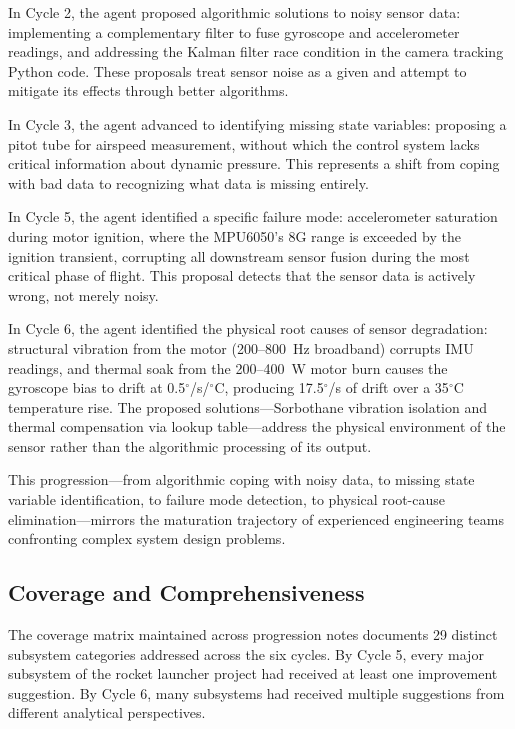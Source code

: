 \documentclass[11pt,letterpaper]{article}
\begin{document}
In Cycle 2, the agent proposed algorithmic solutions to noisy sensor data: implementing a complementary filter to fuse gyroscope and accelerometer readings, and addressing the Kalman filter race condition in the camera tracking Python code. These proposals treat sensor noise as a given and attempt to mitigate its effects through better algorithms.

In Cycle 3, the agent advanced to identifying missing state variables: proposing a pitot tube for airspeed measurement, without which the control system lacks critical information about dynamic pressure. This represents a shift from coping with bad data to recognizing what data is missing entirely.

In Cycle 5, the agent identified a specific failure mode: accelerometer saturation during motor ignition, where the MPU6050's 8G range is exceeded by the ignition transient, corrupting all downstream sensor fusion during the most critical phase of flight. This proposal detects that the sensor data is actively wrong, not merely noisy.

In Cycle 6, the agent identified the physical root causes of sensor degradation: structural vibration from the motor (200--800~Hz broadband) corrupts IMU readings, and thermal soak from the 200--400~W motor burn causes the gyroscope bias to drift at 0.5$^\circ$/s/$^\circ$C, producing 17.5$^\circ$/s of drift over a 35$^\circ$C temperature rise. The proposed solutions---Sorbothane vibration isolation and thermal compensation via lookup table---address the physical environment of the sensor rather than the algorithmic processing of its output.

This progression---from algorithmic coping with noisy data, to missing state variable identification, to failure mode detection, to physical root-cause elimination---mirrors the maturation trajectory of experienced engineering teams confronting complex system design problems.

\subsection{Coverage and Comprehensiveness}

The coverage matrix maintained across progression notes documents 29 distinct subsystem categories addressed across the six cycles. By Cycle 5, every major subsystem of the rocket launcher project had received at least one improvement suggestion. By Cycle 6, many subsystems had received multiple suggestions from different analytical perspectives.
\end{document}
